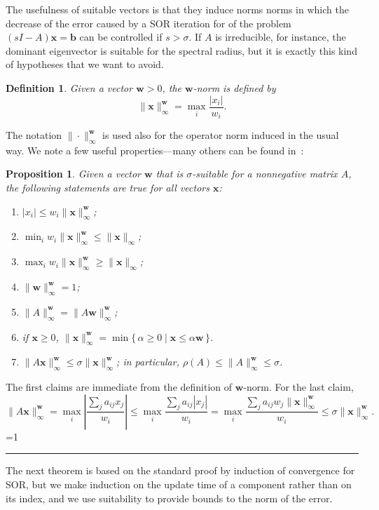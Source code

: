 \documentclass{article}
\newcommand{\w}{{\bm w}}
\newcommand{\x}{{\bm x}}
\newcommand{\1}{\mathbf 1}
\newtheorem{definition}{Definition}
\newtheorem{proposition}{Proposition}
\newcounter{noqed}
\newcommand{\qed}{ \ifmmode\mbox{ }\fi\rule[-.05em]{.3em}{.7em}\setcounter{noqed}{0}}
\newenvironment{proof}[1][{}]{\noindent{\bf Proof#1. }\setcounter{noqed}{1}}{\ifnum\value{noqed}=1\qed\fi\par\medskip}
\begin{document}
The usefulness of suitable vectors is that they induce norms
norms in which the decrease of the error caused by a SOR
iteration for of the problem $(sI-A) \x = \bm b$ can be controlled if
$s>\sigma$. If $A$ is irreducible, for instance, the dominant eigenvector is suitable
for the spectral radius, but it is exactly this kind of hypotheses that we want to avoid.
\begin{definition}
Given a vector $\w>0$, the $\w$-norm is defined by
\[\|\x\|^\w_\infty = \max_i\frac{|x_i|}{w_i}.\]
\end{definition}
The notation $\|\cdot\|_\infty^\w$ is used also for the operator norm induced
in the usual way.
We note a few useful properties---many others can be found in~\cite{BeTPDCNM}:
\begin{proposition}
\label{prop:wnorm}
Given a vector $\w$ that is $\sigma$-suitable for a nonnegative matrix $A$, the
following statements are true for all vectors $\x$:
\begin{enumerate}
\item\label{en:coord} $\bigl|x_i\bigr|\leq w_i\|\x\|_\infty^\w$;
\item\label{en:min} $\min_i w_i\|\x\|_\infty^\w\leq\|\x\|_\infty$;
\item\label{en:max} $\max_i w_i\|\x\|_\infty^\w\geq \|\x\|_\infty$;
\item\label{en:unit} $\|\w\|_\infty^\w=1$;
\item\label{en:Aw} $\|A\|_\infty^\w=\|A\w\|_\infty^\w$;
\item\label{en:mindef} if $\bm x\geq0$, $\|\bm
x\|^\w_\infty=\min\{\,\alpha\geq0\mid \x \leq \alpha \w\,\}$.
\item\label{en:suitable} $\|A\x\|_\infty^\w\leq\sigma\|\x\|_\infty^\w$; in
particular, $\rho(A)\leq\|A\|_\infty^\w\leq\sigma$.
\end{enumerate}
\end{proposition}
\begin{proof}
The first claims are immediate from the definition of $\w$-norm. For the last
claim,
\[
\|A\x\|_\infty^\w =\max_i\left|\frac{\sum_j a_{ij}x_j}{w_i}\right|\leq
\max_i\frac{\sum_j a_{ij}|x_j|}{w_i}=
\max_i\frac{\sum_j
a_{ij}w_j\|\x\|_\infty^\w}{w_i}\leq\sigma\|\x\|_\infty^\w.
\]
\end{proof}

The next theorem is based on the standard proof by induction of convergence
for SOR, but we make induction on the update time of a component rather than on its index,
and we use suitability to provide bounds to the norm of the error.
\end{document}

